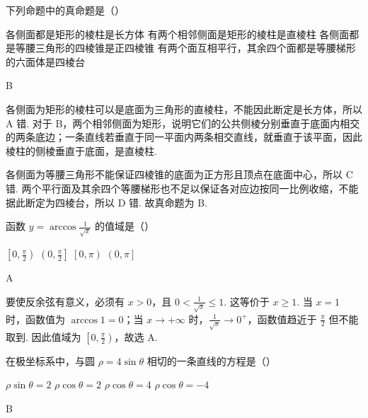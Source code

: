 \documentclass[UTF8,a4paper,oneside,11pt]{ctexbook}
\begin{document}
\begin{problem}
下列命题中的真命题是（\quad）

\choices
    {各侧面都是矩形的棱柱是长方体}
    {有两个相邻侧面是矩形的棱柱是直棱柱}
    {各侧面都是等腰三角形的四棱锥是正四棱锥}
    {有两个面互相平行，其余四个面都是等腰梯形的六面体是四棱台}
\end{problem}

\begin{answer}
B
\end{answer}

\begin{solution}
各侧面为矩形的棱柱可以是底面为三角形的直棱柱，不能因此断定是长方体，所以 A 错. 对于 B，两个相邻侧面为矩形，说明它们的公共侧棱分别垂直于底面内相交的两条底边；一条直线若垂直于同一平面内两条相交直线，就垂直于该平面，因此棱柱的侧棱垂直于底面，是直棱柱.

各侧面为等腰三角形不能保证四棱锥的底面为正方形且顶点在底面中心，所以 C 错. 两个平行面及其余四个等腰梯形也不足以保证各对应边按同一比例收缩，不能据此断定为四棱台，所以 D 错. 故真命题为 B.
\end{solution}

\begin{problem}
函数 \(y = \arccos \frac{1}{\sqrt{x}}\) 的值域是（\quad）

\choices
    {\(\left[0,\frac{\pi}{2}\right)\)}
    {\(\left(0,\frac{\pi}{2}\right]\)}
    {\(\left[0,\pi\right)\)}
    {\(\left(0,\pi\right]\)}
\end{problem}

\begin{answer}
A
\end{answer}

\begin{solution}
要使反余弦有意义，必须有 \(x>0\)，且 \(0<\frac{1}{\sqrt{x}}\leqslant1\). 这等价于 \(x\geqslant1\). 当 \(x=1\) 时，函数值为 \(\arccos1=0\)；当 \(x\to+\infty\) 时，\(\frac{1}{\sqrt{x}}\to0^+\)，函数值趋近于 \(\frac{\pi}{2}\) 但不能取到. 因此值域为 \(\left[0,\frac{\pi}{2}\right)\)，故选 A.
\end{solution}

\begin{problem}
在极坐标系中，与圆 \(\rho = 4\sin \theta\) 相切的一条直线的方程是（\quad）

\choices
    {\(\rho \sin \theta = 2\)}
    {\(\rho \cos \theta = 2\)}
    {\(\rho \cos \theta = 4\)}
    {\(\rho \cos \theta = -4\)}
\end{problem}

\begin{answer}
B
\end{answer}
\end{document}
